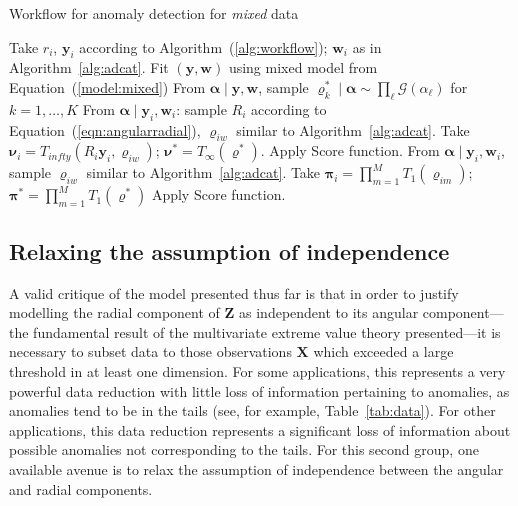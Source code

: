 \begin{algorithm}[htb]
    \caption{Workflow for anomaly detection for \emph{mixed} data}\label{alg:admixed}
    \begin{algorithmic}[1]
        \State Take $r_i$, $\bm{y}_i$ according to Algorithm~(\ref{alg:workflow}); $\bm{w}_i$ as in Algorithm~\ref{alg:adcat}.
        \State Fit $(\bm{y},\bm{w})$ using mixed model from Equation~(\ref{model:mixed})
        \State From $\bm{\alpha}\mid\bm{y},\bm{w}$, sample
            $\bm{\varrho}_k^{*}\mid\bm{\alpha}\sim\prod_{\ell}\mathcal{G}(\alpha_{\ell})$ for $k = 1,\ldots,K$
            \State From $\bm{\alpha}\mid\bm{y}_i,\bm{w}_i$:
                sample $R_i$ according to Equation~(\ref{eqn:angularradial}), 
                $\bm{\varrho}_{iw}$ similar to Algorithm~\ref{alg:adcat}.
            \State Take $\bm{\nu}_i = T_{infty}(R_i\bm{y}_i,\bm{\varrho}_{iw})$;      
                $\bm{\nu}^* = T_{\infty}(\bm{\varrho}^*)$.
            \State Apply Score function.
            \State From $\bm{\alpha}\mid\bm{y}_i,\bm{w}_i$, 
                sample $\bm{\varrho}_{iw}$ similar to Algorithm~\ref{alg:adcat}.
            \State Take $\bm{\pi}_i = \prod_{m = 1}^M T_{1}(\bm{\varrho}_{im})$;    
                $\bm{\pi}^* = \prod_{m = 1}^{M} T_1(\bm{\varrho}^*)$
            \State Apply Score function.
        \EndIf
    \end{algorithmic}
\end{algorithm}

\subsection{Relaxing the assumption of independence\label{subsec:rank}}
A valid critique of the model presented thus far is that in order to justify 
    modelling the radial component of $\bm{Z}$ as independent to its angular 
    component---the fundamental result of the multivariate extreme value theory 
    presented---it is necessary to subset data to those observations $\bm{X}$ which exceeded a large 
    threshold in at least one dimension.  For some applications, 
    this represents a very powerful data reduction with little loss of 
    information pertaining to anomalies, as anomalies tend to be in the tails 
    (see, for  example, Table~\ref{tab:data}).  For other applications, this 
    data reduction represents a significant loss of information about possible
    anomalies not corresponding to the tails.  For this second group,
    one available avenue is to relax the assumption of independence between the 
    angular and radial components.

